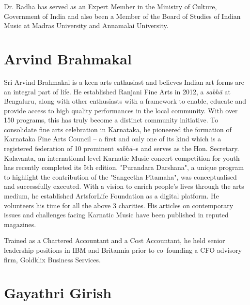 Dr. Radha has served as an Expert Member in the Ministry of Culture, Government of India and also been a Member of the Board of Studies of Indian Music at Madras University and Annamalai University.

\vspace{-.3cm}

\section*{Arvind Brahmakal}

Sri Arvind Brahmakal is a keen arts enthusiast and believes Indian art forms are an integral part of life. He established Ranjani Fine Arts in 2012, a \textit{sabhā} at Bengaluru, along with other enthusiasts with a framework to enable, educate and provide access to high quality performances in the local community. With over 150 programs, this has truly become a distinct community initiative. To consolidate fine arts celebration in Karnataka, he pioneered the formation of Karnataka Fine Arts Council – a first and only one of its kind which is a registered federation of 10 prominent \textit{sabhā}–s and serves as the Hon. Secretary. Kalavanta, an international level Karnatic Music concert competition for youth has recently completed its 5th edition. "Purandara Darshana", a unique program to highlight the contribution of the "Sangeetha Pitamaha", was conceptualised and successfully executed. With a vision to enrich people's lives through the arts medium, he established ArtsforLife Foundation as a digital platform. He volunteers his time for all the above 3 charities. His articles on contemporary issues and challenges facing Karnatic Music have been published in reputed magazines.

Trained as a Chartered Accountant and a Cost Accountant, he held senior leadership positions in IBM and Britannia prior to co–founding a CFO advisory firm, Goldklix Business Services.


\section*{Gayathri Girish}

